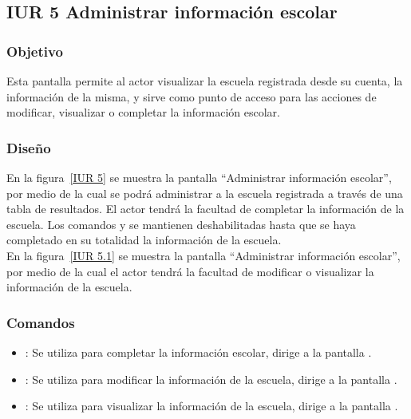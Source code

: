 \subsection{IUR 5 Administrar información escolar}

\subsubsection{Objetivo}
	
     Esta pantalla permite al actor  visualizar la escuela registrada desde su cuenta, la información de la misma, y sirve como punto de acceso para las acciones de modificar, visualizar o completar la información escolar.

\subsubsection{Diseño}

    En la figura~\ref{IUR 5} se muestra la pantalla ``Administrar información escolar'', por medio de la cual se podrá administrar a la escuela registrada a través de una tabla de resultados. El actor tendrá la facultad de completar la información de la escuela. 
    Los comandos  y  se mantienen deshabilitadas hasta que se haya completado en su totalidad la información de la escuela.\\

    En la figura~\ref{IUR 5.1} se muestra la pantalla ``Administrar información escolar'', por medio de la cual el actor tendrá la facultad de modificar o visualizar la información de la escuela. \\



    
\subsubsection{Comandos}
    \begin{itemize}
    \item {}: Se utiliza para completar la información escolar, dirige a la pantalla .
	\item {}: Se utiliza para modificar la información de la escuela, dirige a la pantalla .
    \item {}: Se utiliza para visualizar la información de la escuela, dirige a la pantalla .
    \end{itemize}

 